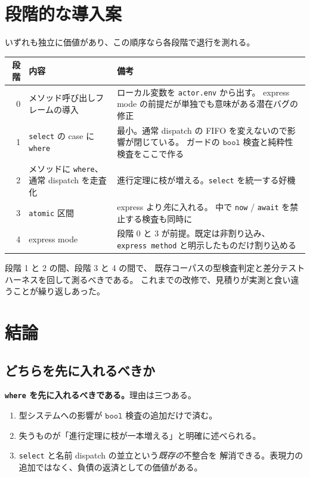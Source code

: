 \documentclass[11pt,a4paper]{ltjsarticle}
\theoremstyle{remark}
\newcommand{\ty}[1]{\ensuremath{\mathtt{#1}}}
\begin{document}
\section{段階的な導入案}

いずれも独立に価値があり、この順序なら各段階で退行を測れる。

\begin{center}
\small
\begin{tabular}{@{}rlp{7.2cm}@{}}
\toprule
段階 & 内容 & 備考 \\
\midrule
0 & メソッド呼び出しフレームの導入 &
  ローカル変数を \texttt{actor.env} から出す。
  express mode の前提だが単独でも意味がある潜在バグの修正 \\
1 & \texttt{select} の case に \texttt{where} &
  最小。通常 dispatch の FIFO を変えないので影響が閉じている。
  ガードの \ty{bool} 検査と純粋性検査をここで作る \\
2 & メソッドに \texttt{where}、通常 dispatch を走査化 &
  進行定理に枝が増える。\texttt{select} を統一する好機 \\
3 & \texttt{atomic} 区間 &
  express より\emph{先}に入れる。
  中で \texttt{now} / \texttt{await} を禁止する検査も同時に \\
4 & express mode &
  段階 0 と 3 が前提。既定は非割り込み、
  \texttt{express method} と明示したものだけ割り込める \\
\bottomrule
\end{tabular}
\end{center}

段階 1 と 2 の間、段階 3 と 4 の間で、
既存コーパスの型検査判定と差分テストハーネスを回して測るべきである。
これまでの改修で、見積りが実測と食い違うことが繰り返しあった。

\section{結論}

\subsection{どちらを先に入れるべきか}

\textbf{\texttt{where} を先に入れるべきである。}理由は三つある。

\begin{enumerate}
\item 型システムへの影響が \ty{bool} 検査の追加だけで済む。
\item 失うものが「進行定理に枝が一本増える」と明確に述べられる。
\item \texttt{select} と名前 dispatch の並立という\emph{既存の}不整合を
  解消できる。表現力の追加ではなく、負債の返済としての価値がある。
\end{enumerate}
\end{document}
